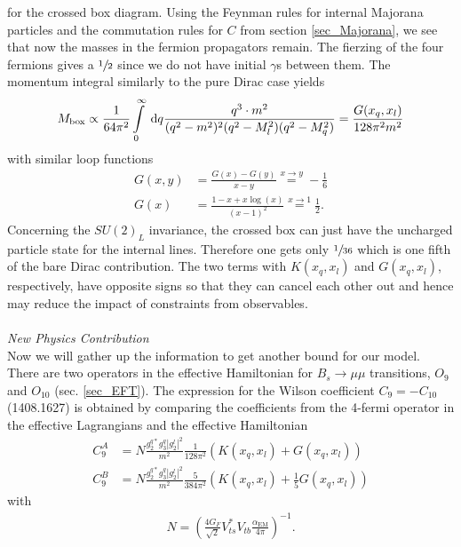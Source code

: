 for the crossed box diagram. Using the Feynman rules for internal Majorana particles and the commutation rules for $C$ from section \ref{sec_Majorana}, 
we see that now the masses in the fermion propagators remain. The fierzing of the four fermions gives a $\sfrac12$ since we do not have initial $\gamma$s
between them. The momentum integral similarly to the pure Dirac case yields
\begin{align}
 M_\text{box} \propto \frac{1}{64 \pi^2}\int\limits_0^\infty \; \mathrm{d} q \frac{q^3 \cdot m^2}{(q^2-m^2)^2(q^2-M_l^2)(q^2-M_q^2)} = \frac{G(x_q,x_l)}{128\pi^2m^2}
\end{align}
with similar loop functions
\begin{align}
 G(x,y) &= \frac{G(x)-G(y)}{x-y}\stackrel{x\rightarrow y}{=} -\frac16\\
 G(x)&=\frac{1-x+x\log(x)}{(x-1)^2} \stackrel{x\rightarrow 1}{=} \frac12.
\end{align}
Concerning the $SU(2)_L$ invariance, the crossed box can just have the uncharged particle state for the internal lines. Therefore one gets only $\sfrac{1}{36}$
which is one fifth of the bare Dirac contribution. The two terms with $K(x_q,x_l)$ and $G(x_q,x_l)$, respectively, have opposite signs so that they can cancel
each other out and hence may reduce the impact of constraints from observables.\\
\\ \textit{New Physics Contribution}\\
\noindent Now we will gather up the information to get another bound for our model. There are two operators in the effective Hamiltonian for $B_s\rightarrow \mu\mu$
transitions, $O_9$ and $O_{10}$ (sec. \ref{sec_EFT}). The expression for the Wilson coefficient $C_9 = -C_{10}$ (1408.1627) is obtained by comparing the coefficients from the 
4-fermi operator in the effective Lagrangians and the effective Hamiltonian
\begin{align}
 C_9^A &= N \frac{g_2^{q*}g_3^q|g_2^l|^2}{m^2} \frac{1}{128\pi^2} \left(K(x_q,x_l) + G(x_q,x_l)\right)\\
 C_9^B &= N \frac{g_2^{q*}g_3^q|g_2^l|^2}{m^2} \frac{5}{384\pi^2} \left(K(x_q,x_l) + \frac15 G(x_q,x_l)\right)
\end{align}
with
\begin{align}
 N = \left(\frac{4G_F}{\sqrt{2}} V_{ts}^*V_{tb} \frac{\alpha_\text{EM}}{4\pi}\right)^{-1}.
\end{align}


%  
